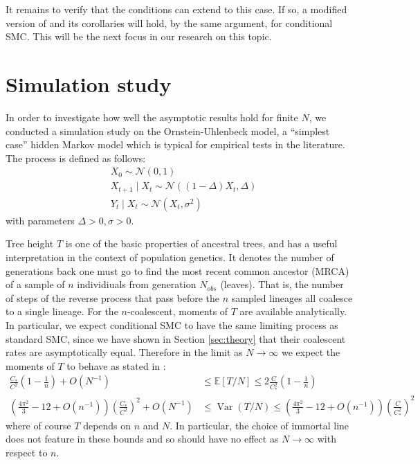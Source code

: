 \documentclass{article}
\newcommand{\E}{\mathbb{E}}
\newcommand{\V}{\operatorname{Var}}
\newcommand{\N}{\mathcal{N}}
\begin{document}
It remains to verify that the conditions \citep[(3)--(4)]{koskela2018} can extend to this case. If so, a modified version of \citet[Theorem 1]{koskela2018} and its corollaries will hold, by the same argument, for conditional SMC. This will be the next focus in our research on this topic.

\section{Simulation study}\label{sec:simulations}
In order to investigate how well the asymptotic results hold for finite $N$, we conducted a simulation study on the Ornstein-Uhlenbeck model, a ``simplest case'' hidden Markov model which is typical for empirical tests in the literature. The process is defined as follows:
\begin{align*}
& X_0 \sim \N(0,1) \\
& X_{t+1} \mid X_t \sim \N((1-\Delta)X_t, \Delta) \\
& Y_t \mid X_{t} \sim \N(X_t, \sigma^2)
\end{align*}
with parameters $\Delta >0, \sigma >0$.

Tree height $T$ is one of the basic properties of ancestral trees, and has a useful interpretation in the context of population genetics. It denotes the number of generations back one must go to find the most recent common ancestor (MRCA) of a sample of $n$ individiuals from generation $N_{obs}$ (leaves). That is, the number of steps of the reverse process that pass before the $n$ sampled lineages all coalesce to a single lineage. For the $n$-coalescent, moments of $T$ are available analytically. In particular, we expect conditional SMC to have the same limiting process as standard SMC, since we have shown in Section \ref{sec:theory} that their coalescent rates are asymptotically equal. Therefore in the limit as $N\to\infty$ we expect the moments of $T$ to behave as stated in \citet[Corollary 1]{koskela2018}:
\begin{align*}
\frac{C_*}{C^2} \left(1-\frac{1}{n}\right) + O(N^{-1}) &\leq \E[T/N] \leq 2\frac{C}{C_*^2} \left(1-\frac{1}{n}\right) \\
\left(\frac{4\pi^2}{3} - 12 + O(n^{-1})\right) \left(\frac{C_*}{C^2}\right)^2 + O(N^{-1}) &\leq \V(T/N) \leq \left(\frac{4\pi^2}{3} - 12 + O(n^{-1})\right) \left(\frac{C}{C_*^2}\right)^2
\end{align*}
where of course $T$ depends on $n$ and $N$. In particular, the choice of immortal line does not feature in these bounds and so should have no effect as $N \to\infty$ with respect to $n$.
\end{document}
